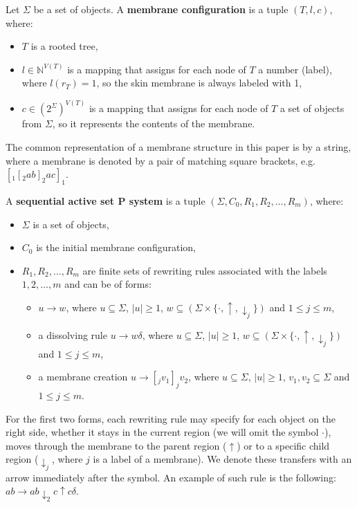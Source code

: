 Let $\Sigma$ be a set of objects. A {\bf membrane configuration} is a tuple $(T, l, c)$, where:
\begin{itemize}
  \item $T$ is a rooted tree,
  \item $l\in\mathbb N^{V(T)}$ is a mapping that assigns for each node of $T$ a number (label), where $l(r_T)=1$, so the skin membrane is always labeled with 1,
  \item $c\in(2^\Sigma)^{V(T)}$ is a mapping that assigns for each node of $T$ a set of objects from $\Sigma$, so it represents the contents of the membrane.
\end{itemize}

The common representation of a membrane structure in this paper is by a string, where a membrane is denoted by a pair of matching square brackets, e.g. $[_1 [_2 ab ]_2 ac ]_1$.

A {\bf sequential active set P system} is a tuple $(\Sigma, C_0, R_1, R_2, \dots , R_m)$, where:
\begin{itemize}
  \item $\Sigma$ is a set of objects,
  \item $C_0$ is the initial membrane configuration,
  \item $R_1,R_2,\dots, R_m$ are finite sets of rewriting rules associated with the labels $1,2,\dots,m$ and can be of forms:
  \begin{itemize}
    \item $u\rightarrow w$, where $u\subseteq \Sigma$, $|u|\geq 1$, $w\subseteq (\Sigma\times\{\cdot, \uparrow, \downarrow_j\})$ and $1\leq j\leq m$,
    \item a dissolving rule $u\rightarrow w\delta$, where $u\subseteq \Sigma$, $|u|\geq 1$, $w\subseteq (\Sigma\times\{\cdot, \uparrow, \downarrow_j\})$ and $1\leq j\leq m$,
    \item a membrane creation $u\rightarrow [_j v_1]_j v_2$, where $u\subseteq \Sigma$, $|u|\geq 1$, $v_1, v_2\subseteq \Sigma$ and $1\leq j\leq m$.
  \end{itemize}
\end{itemize}

For the first two forms, each rewriting rule may specify for each object on the right side, whether it stays in the current region (we will omit the symbol $\cdot$), moves through the membrane to the parent region ($\uparrow$)
or to a specific child region ($\downarrow_j$, where $j$ is a label of a membrane).
We denote these transfers with an arrow immediately after the symbol.
An example of such rule is the following: $ab\rightarrow ab\downarrow_2 c\uparrow c\delta$.


